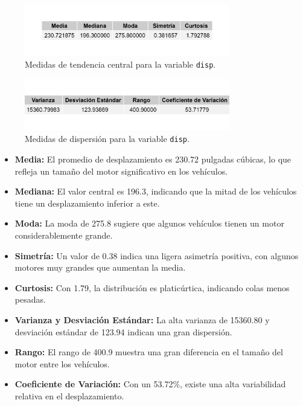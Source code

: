 \documentclass{article}
\begin{document}
\begin{enumerate}
	      \begin{figure}[H]
		      \centering
		      \includegraphics[width=0.8\textwidth]{MTC/disp_central.png}
		      \caption{Medidas de tendencia central para la variable \texttt{disp}.}
		      \label{fig:disp_central}
	      \end{figure}

	      \begin{figure}[H]
		      \centering
		      \includegraphics[width=0.8\textwidth]{MTC/disp_dispersion.png}
		      \caption{Medidas de dispersión para la variable \texttt{disp}.}
		      \label{fig:disp_dispersion}
	      \end{figure}

	      \begin{itemize}
		      \item \textbf{Media:} El promedio de desplazamiento es 230.72 pulgadas cúbicas, lo que refleja un tamaño del motor significativo en los vehículos.
		      \item \textbf{Mediana:} El valor central es 196.3, indicando que la mitad de los vehículos tiene un desplazamiento inferior a este.
		      \item \textbf{Moda:} La moda de 275.8 sugiere que algunos vehículos tienen un motor considerablemente grande.
		      \item \textbf{Simetría:} Un valor de 0.38 indica una ligera asimetría positiva, con algunos motores muy grandes que aumentan la media.
		      \item \textbf{Curtosis:} Con 1.79, la distribución es platicúrtica, indicando colas menos pesadas.
		      \item \textbf{Varianza y Desviación Estándar:} La alta varianza de 15360.80 y desviación estándar de 123.94 indican una gran dispersión.
		      \item \textbf{Rango:} El rango de 400.9 muestra una gran diferencia en el tamaño del motor entre los vehículos.
		      \item \textbf{Coeficiente de Variación:} Con un 53.72\%, existe una alta variabilidad relativa en el desplazamiento.
	      \end{itemize}


\end{enumerate}
\end{document}
